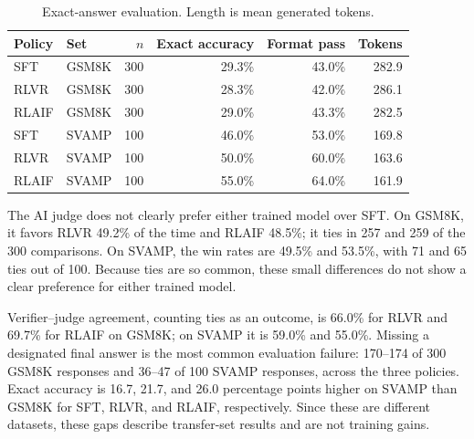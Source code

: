 \documentclass[10pt]{article}
\begin{document}
\begin{table}[h]
\centering\scriptsize
\caption{Exact-answer evaluation. Length is mean generated tokens.}
\begin{tabular}{llrrrr}
\toprule
Policy & Set & $n$ & Exact accuracy & Format pass & Tokens \\
\midrule
SFT & GSM8K & 300 & 29.3\% & 43.0\% & 282.9 \\
RLVR & GSM8K & 300 & 28.3\% & 42.0\% & 286.1 \\
RLAIF & GSM8K & 300 & 29.0\% & 43.3\% & 282.5 \\
SFT & SVAMP & 100 & 46.0\% & 53.0\% & 169.8 \\
RLVR & SVAMP & 100 & 50.0\% & 60.0\% & 163.6 \\
RLAIF & SVAMP & 100 & 55.0\% & 64.0\% & 161.9 \\
\bottomrule
\end{tabular}
\end{table}

The AI judge does not clearly prefer either trained model over SFT. On GSM8K, it favors RLVR 49.2\% of the time and RLAIF 48.5\%; it ties in 257 and 259 of the 300 comparisons. On SVAMP, the win rates are 49.5\% and 53.5\%, with 71 and 65 ties out of 100. Because ties are so common, these small differences do not show a clear preference for either trained model.

Verifier--judge agreement, counting ties as an outcome, is 66.0\% for RLVR and 69.7\% for RLAIF on GSM8K; on SVAMP it is 59.0\% and 55.0\%. Missing a designated final answer is the most common evaluation failure: 170--174 of 300 GSM8K responses and 36--47 of 100 SVAMP responses, across the three policies. Exact accuracy is 16.7, 21.7, and 26.0 percentage points higher on SVAMP than GSM8K for SFT, RLVR, and RLAIF, respectively. Since these are different datasets, these gaps describe transfer-set results and are not training gains.
\end{document}
